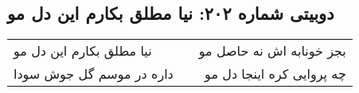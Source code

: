 \begin{center}
\section*{دوبیتی شماره ۲۰۲: نیا مطلق بکارم این دل مو}
\label{sec:202}
\begin{longtable}{l p{0.5cm} r}
نیا مطلق بکارم این دل مو
&&
بجز خونابه اش نه حاصل مو
\\
داره در موسم گل جوش سودا
&&
چه پروایی کره اینجا دل مو
\\
\end{longtable}
\end{center}
